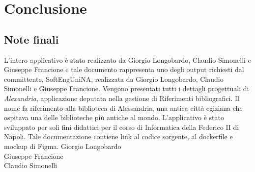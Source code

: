 \chapter{Conclusione}
\raggedright{\section{Note finali}}
L'intero applicativo è stato realizzato da Giorgio Longobardo, Claudio Simonelli e Giuseppe Francione e tale documento rappresenta uno degli output richiesti dal committente, SoftEngUniNA, realizzata da Giorgio Longobardo, Claudio Simonelli e Giuseppe Francione. Vengono presentati tutti i dettagli progettuali di \textit{Alexandria}, applicazione deputata nella gestione di Riferimenti bibliografici. Il nome fa riferimento alla biblioteca di Alessandria, una antica città egiziana che ospitava una delle biblioteche più antiche al mondo. L'applicativo è stato sviluppato per soli fini didattici per il corso di Informatica della Federico II di Napoli. Tale documentazione contiene link al codice sorgente, al dockerfile e mockup di Figma.
\hspace{0pt}
\vfill
    \raggedleft Giorgio Longobardo \\ Giuseppe Francione \\ Claudio Simonelli
\vfill
\hspace{0pt}
